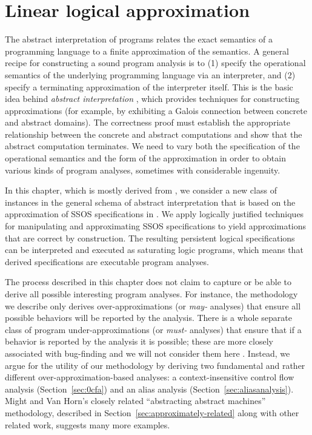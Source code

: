 \chapter{Linear logical approximation}
\label{chapter-approx}

The abstract interpretation of programs relates the exact semantics of
a programming language to a finite approximation of the semantics. A
general recipe for constructing a sound program analysis is to (1)
specify the operational semantics of the underlying programming
language via an interpreter, and (2) specify a terminating
approximation of the interpreter itself. This is the basic idea behind
{\it abstract interpretation} \cite{cousot77abstract}, which provides
techniques for constructing approximations (for example, by exhibiting
a Galois connection between concrete and abstract domains). The
correctness proof must establish the appropriate relationship between
the concrete and abstract computations and show that the abstract
computation terminates. We need to vary both the specification of
the operational semantics and the form of the approximation in order
to obtain various kinds of program analyses, sometimes with
considerable ingenuity.

In this chapter, which is mostly derived from \cite{simmons11logical},
we consider a new class of instances in the general schema of abstract
interpretation that is based on the approximation of SSOS
specifications in \sls. We apply logically justified techniques for
manipulating and approximating SSOS specifications to yield
approximations that are correct by construction. The resulting
persistent logical specifications can be interpreted and executed as
saturating logic programs, which means that derived specifications
are executable program analyses.

The process described in this chapter does not claim to capture or be
able to derive all possible interesting program analyses. For
instance, the methodology we describe only derives over-approximations
(or {\it may-} analyses) that ensure all possible behaviors will be
reported by the analysis. There is a whole separate class of program
under-approximations (or {\it must-} analyses) that ensure that if a
behavior is reported by the analysis it is possible; these are more
closely associated with bug-finding and we will not consider them here
\cite{godefroid10compositional}. Instead, we argue for the utility of
our methodology by deriving two fundamental and rather different
over-approximation-based analyses: a context-insensitive control flow
analysis (Section~\ref{sec:0cfa}) and an alias analysis
(Section~\ref{sec:aliasanalysis}). Might and Van Horn's closely
related ``abstracting abstract machines'' methodology, described in
Section~\ref{sec:approximately-related} along with other related work,
suggests many more examples.

